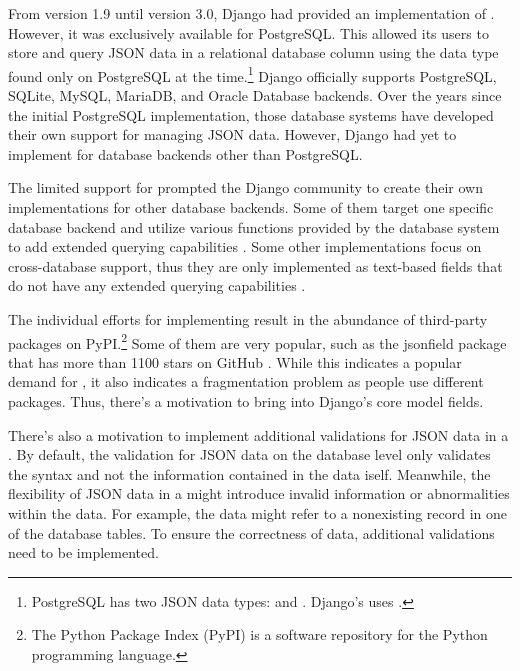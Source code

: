 From version 1.9 until version 3.0, Django had provided an implementation of
. However, it was exclusively available for PostgreSQL. This
 allowed its users to store and query JSON data in a relational
database column using the  data type found only on PostgreSQL at
the time.\footnote{PostgreSQL has two JSON data types:  and
. Django's  uses .} Django officially
supports PostgreSQL, SQLite, MySQL, MariaDB, and Oracle Database backends. Over
the years since the initial PostgreSQL  implementation, those
database systems have developed their own support for managing JSON data.
However, Django had yet to implement  for database backends
other than PostgreSQL.

The limited support for  prompted the Django community to
create their own  implementations for other database backends.
Some of them target one specific database backend and utilize various functions
provided by the database system to add extended querying capabilities
\cite{mysql_jsonfield, oracle_jsonfield}. Some other implementations
focus on cross-database support, thus they are only implemented as text-based
fields that do not have any extended querying capabilities
\cite{ryan_jsonfield}.

The individual efforts for implementing  result in the
abundance of third-party  packages on PyPI.\footnote{The Python
Package Index (PyPI) is a software repository for the Python programming
language.} Some of them are very popular, such as the \mbox{jsonfield} package
that has more than 1100 stars on GitHub \cite{ryan_jsonfield}. While this
indicates a popular demand for , it also indicates a
fragmentation problem as people use different  packages. Thus,
there's a motivation to bring  into Django's core model fields.

There's also a motivation to implement additional validations for JSON data in
a . By default, the validation for JSON data on the database
level only validates the syntax and not the information contained in the data
iself. Meanwhile, the flexibility of JSON data in a  might
introduce invalid information or abnormalities within the data. For example,
the data might refer to a nonexisting record in one of the database tables. To
ensure the correctness of  data, additional validations need to
be implemented.

